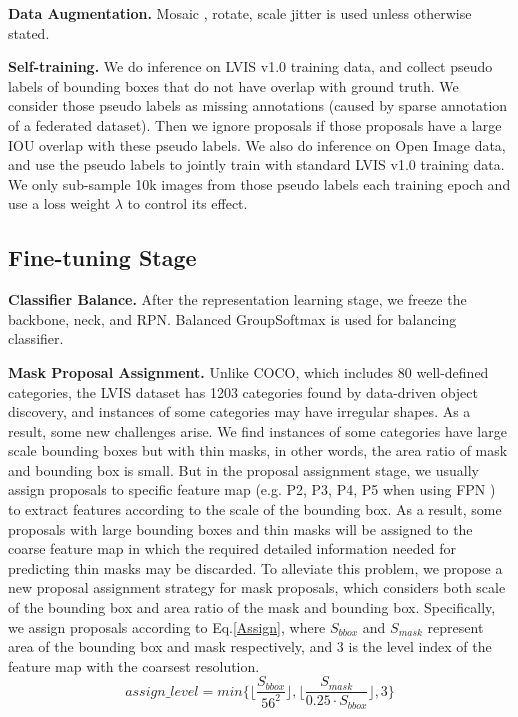 \documentclass[runningheads]{llncs}
\begin{document}
 \noindent \textbf{Data Augmentation.} Mosaic \cite{bochkovskiy2020yolov4}, rotate, scale jitter is used unless otherwise stated.
 
 \noindent \textbf{Self-training.} 
 We do inference on LVIS v1.0 training data, and collect pseudo labels of bounding boxes that do not have overlap with ground truth. We consider those pseudo labels as missing annotations (caused by sparse annotation of a federated dataset). Then we ignore proposals if those proposals have a large IOU overlap with these pseudo labels. We also do inference on Open Image data, and use the pseudo labels to jointly train with standard LVIS v1.0 training data. We only sub-sample 10k images from those pseudo labels each training epoch and use a loss weight $\lambda$ to control its effect.
 
 \subsection{Fine-tuning Stage}
 
 \noindent \textbf{Classifier Balance.} After the representation learning stage, we freeze the backbone, neck, and RPN. Balanced GroupSoftmax \cite{li2020overcoming} is used for balancing classifier.
 
 \noindent \textbf{Mask Proposal Assignment.}  Unlike COCO, which includes 80 well-defined categories, the LVIS dataset has 1203 categories found by data-driven object discovery, and instances of some categories may have irregular shapes. As a result, some new challenges arise. We find instances of some categories have large scale bounding boxes but with thin masks, in other words, the area ratio of mask and bounding box is small. But in the proposal assignment stage, we usually assign proposals to specific feature map (e.g. P2, P3, P4, P5 when using FPN \cite{lin2017feature}) to extract features according to the scale of the bounding box. As a result, some proposals with large bounding boxes and thin masks will be assigned to the coarse feature map in which the required detailed information needed for predicting thin masks may be discarded. To alleviate this problem, we propose a new proposal assignment strategy for mask proposals, which considers both scale of the bounding box and area ratio of the mask and bounding box. Specifically, we assign proposals according to Eq.\ref{Assign}, where $S_{bbox}$ and $S_{mask}$ represent area of the bounding box and mask respectively, and 3 is the level index of the feature map with the coarsest resolution.
 \begin{equation}
    \label{Assign}
     assign\_level = min\lbrace\lfloor\frac{S_{bbox}}{56^2}\rfloor, \lfloor\frac{S_{mask}}{0.25 \cdot S_{bbox}}\rfloor, 3\rbrace
 \end{equation}
 
\end{document}
